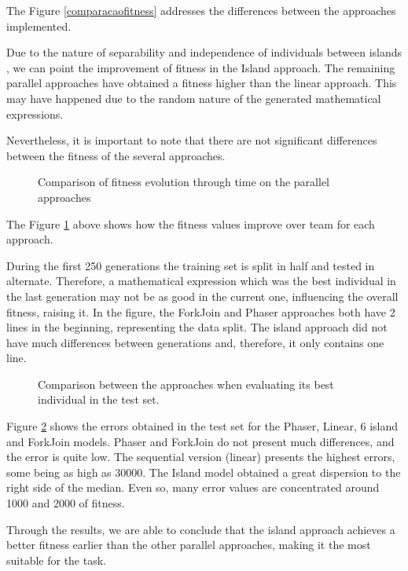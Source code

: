 \documentclass[runningheads]{llncs}
\begin{document}
The Figure \ref{comparacaofitness} addresses the differences between the approaches implemented.

Due to the nature of separability and independence of individuals between islands \cite{islandModelGA}, we can point the  improvement of fitness in the Island approach.
The remaining parallel approaches have obtained a fitness higher than the linear approach. This may have happened due to the random nature of the generated mathematical expressions.

Nevertheless, it is important to note that there are not significant differences between the fitness of the several approaches.

\begin{figure}[H]
\centering
{}
\caption{Comparison of fitness evolution through time on the parallel approaches} \label{comparacaoLinhas}
\end{figure}

The Figure \ref{comparacaoLinhas} above shows how the fitness values improve over team for each approach.

During the first 250 generations the training set is split in half and tested in alternate. Therefore, a mathematical expression which was the best individual in the last generation may not be as good in the current one, influencing the overall fitness, raising it. In the figure, the ForkJoin and Phaser approaches both have 2 lines in the beginning, representing the data split. The island approach did not have much differences between generations and, therefore, it only contains one line.

\begin{figure}[H]
\centering
{}
\caption{Comparison between the approaches when evaluating its best individual in the test set.} \label{comparacaoerros}
\end{figure}

Figure \ref{comparacaoerros} shows the errors obtained in the test set for the Phaser, Linear, 6 island and ForkJoin models. Phaser and ForkJoin do not present much differences, and the error is quite low. The sequential version (linear) presents the highest errors, some being as high as 30000. The Island model obtained a great dispersion to the right side of the median. Even so, many error values are concentrated around 1000 and 2000 of fitness. 

Through the results, we are able to conclude that the island approach achieves a better fitness earlier than the other parallel approaches, making it the most suitable for the task.
\end{document}
